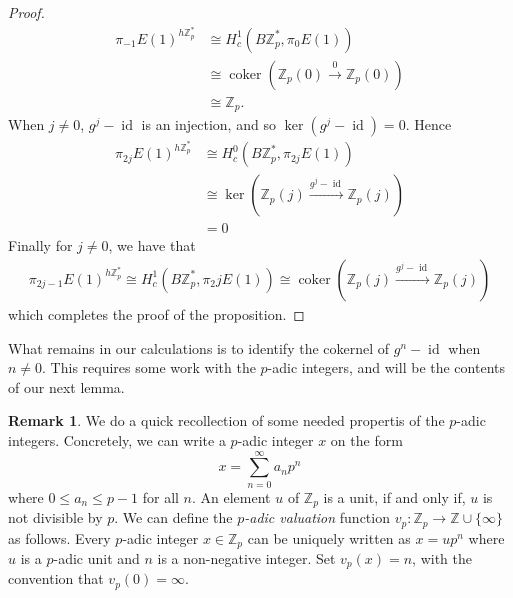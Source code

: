 \documentclass[a4paper]{article} %
\theoremstyle{definition}
\newtheorem{remark}[theorem]{Remark}
\newcommand{\toWithMapLong}[1]{\overset{#1}{\longrightarrow}}
\newcommand{\Z}{\mathbb{Z}}
\DeclareMathOperator{\id}{id}           %
\DeclareMathOperator{\coker}{coker}     %
\begin{document}
\begin{proof}
\begin{align*}
  \pi_{-1} E(1)^{h\Z_p^*} & \cong  H^1_c(B\Z_p^*, \pi_0 E(1)) \\
    & \cong \coker (\Z_p(0) \toWithMapLong{0} \Z_p(0)) \\
    & \cong \Z_p.
\end{align*}
When $j \neq 0$, $g^j - \id$ is an injection, and so $\ker(g^j - \id) = 0$. Hence
\begin{align*}
  \pi_{2j} E(1)^{h\Z_p^*} & \cong  H^0_c(B\Z_p^*, \pi_{2j} E(1)) \\
    & \cong \ker (\Z_p(j) \toWithMapLong{g^j - \id} \Z_p(j)) \\
    &  = 0
\end{align*}
Finally for $j \neq 0$, we have that
\begin{align*}
  \pi_{2j-1} E(1)^{h\Z_p^*}  \cong  H^1_c(B\Z_p^*, \pi_2j E(1))
    \cong \coker (\Z_p(j) \toWithMapLong{g^j - \id} \Z_p(j))
\end{align*}
which completes the proof of the proposition.
\end{proof}
What remains in our calculations is to identify the cokernel of $g^n-\id$ when $n \neq 0$. This requires some work with the $p$-adic integers, and will be the contents of our next lemma.

\begin{remark}
  We do a quick recollection of some needed propertis of the $p$-adic integers.  Concretely, we can write a $p$-adic integer $x$ on the form
  \[
    x=\sum_{n = 0}^\infty a_n p^n
  \]
  where $ 0 \le a_n \le p-1$ for all $n$.
  An element $u$ of $\Z_p$ is a unit, if and only if, $u$ is not divisible by $p$. We can define the \textit{$p$-adic valuation} function $v_p \colon \Z_p \to \Z \cup \{\infty\}$ as follows. Every $p$-adic integer $x \in \Z_p$ can be uniquely written as $x = up^n$ where $u$ is a $p$-adic unit and $n$ is a non-negative integer. Set $v_p(x) = n$, with the convention that $v_p(0) = \infty$.
\end{remark}
\end{document}
